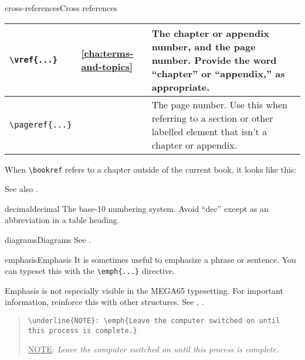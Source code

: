 \begin{sgentry}{cross-references}{Cross references}
\begin{center}
\begin{tabular}{|l|l|p{6cm}|}
        \texttt{{\textbackslash}vref\{...\}} &
        \vref{cha:terms-and-topics} &
        The chapter or appendix number, and the page number. Provide the word ``chapter'' or ``appendix,'' as appropriate. \\
        \hline

        \texttt{{\textbackslash}pageref\{...\}} &
        \pageref{cha:terms-and-topics} &
        The page number. Use this when referring to a section or other labelled element that isn't a chapter or appendix. \\
        \hline
    \end{tabular}
    \end{center}

    When \texttt{{\textbackslash}bookref} refers to a chapter outside of the current book, it looks like this: 

    See also .
\end{sgentry}

\begin{sgentry}{decimal}{decimal}
    The base-10 numbering system. Avoid ``dec'' except as an abbreviation in a table heading.
\end{sgentry}

\begin{sgentry}{diagrams}{Diagrams}
    See .
\end{sgentry}

\begin{sgentry}{emphasis}{Emphasis}
    It is sometimes useful to emphasize a phrase or sentence. You can typeset this with the \texttt{{\textbackslash}emph\{...\}} directive.

    Emphasis is not especially visible in the MEGA65 typesetting. For important information, reinforce this with other structures. See , .

    \begin{quote}
        \texttt{{\textbackslash}underline\{NOTE\}: {\textbackslash}emph\{Leave the computer switched on until this process is complete.\}}

        \hrulefill

        \underline{NOTE}: \emph{Leave the computer switched on until this process is complete.}
    \end{quote}
\end{sgentry}

